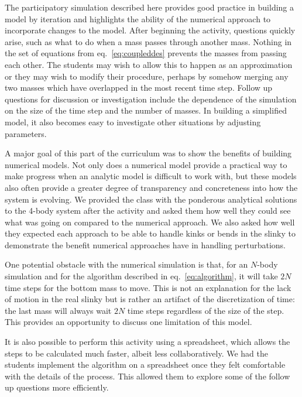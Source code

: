 \documentclass[prb,preprint,superscriptaddress]{revtex4-1}
\newcommand{\eq}[1]{eq.~\eqref{eq:#1}}
\begin{document}
The participatory simulation described here provides good practice in building
a model by iteration and highlights the ability of the numerical approach to incorporate changes to the model. After beginning the activity, questions quickly arise, such
as what to do when a mass passes through another mass. Nothing in the set of equations from \eq{coupleddes} prevents
the masses from passing each other. The students may wish to allow this to happen as an approximation
or they may wish to modify their procedure, perhaps by somehow merging any two masses which have overlapped
in the most recent time step. Follow up questions for discussion or investigation include
the dependence of the simulation on the size of the time step and the number of masses.
In building a simplified model, it also becomes easy to investigate
other situations by adjusting parameters.

A major goal of this part of the curriculum was to show the benefits of building
numerical models. Not only does a numerical model
 provide a practical way to make progress when an analytic model is difficult
to work with, but these models also often provide a greater degree of transparency and
concreteness into how the system is evolving. We provided the class with the
ponderous analytical solutions to the 4-body system after the activity and asked
them how well they could see what was going on compared to the numerical
approach. We also asked how well they expected each approach to be able to
handle kinks or bends in the slinky to demonstrate the benefit numerical
approaches have in handling perturbations.

One potential obstacle with the numerical simulation is that, for an $N$-body simulation and for the algorithm described in \eq{algorithm},
it will take $2N$ time steps for the bottom mass to move. This is not an explanation for
the lack of motion in the real slinky but is rather an artifact of the discretization of time:
the last mass will always wait $2N$ time steps regardless of the size of the step.
This provides an opportunity to discuss one limitation of this model.

It is also possible to perform this activity using a spreadsheet, which allows the steps to be
calculated much faster, albeit less collaboratively. We had the students implement the algorithm on a spreadsheet once they
felt comfortable with the details of the process. This allowed them to explore some of the follow
up questions more efficiently.
\end{document}
